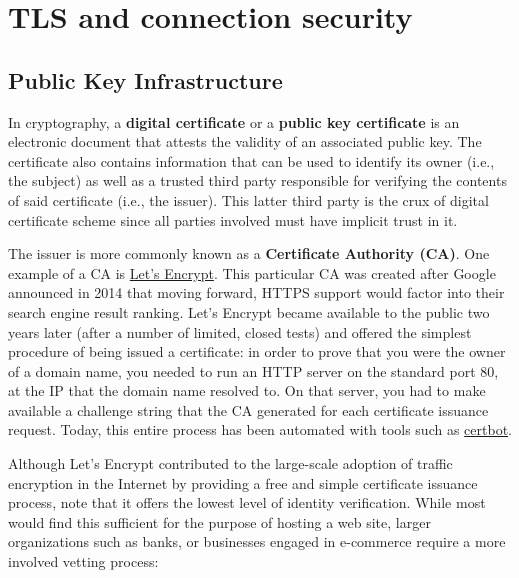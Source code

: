\section{TLS and connection security}

\subsection{Public Key Infrastructure}

In cryptography, a \textbf{digital certificate} or a \textbf{public key
certificate} is an electronic document that attests the validity of an
associated public key. The certificate also contains information that can be
used to identify its owner (i.e., the subject) as well as a trusted third party
responsible for verifying the contents of said certificate (i.e., the issuer).
This latter third party is the crux of digital certificate scheme since all
parties involved must have implicit trust in it.

The issuer is more commonly known as a \textbf{Certificate Authority (CA)}. One
example of a CA is \href{https://letsencrypt.org/}{Let's Encrypt}. This
particular CA was created after Google announced in 2014 that moving forward,
HTTPS support would factor into their search engine result ranking. Let's
Encrypt became available to the public two years later (after a number of
limited, closed tests) and offered the simplest procedure of being issued a
certificate: in order to prove that you were the owner of a domain name, you
needed to run an HTTP server on the standard port 80, at the IP that the domain
name resolved to. On that server, you had to make available a challenge string
that the CA generated for each certificate issuance request. Today, this entire
process has been automated with tools such as
\href{https://certbot.eff.org/instructions}{certbot}.

Although Let's Encrypt contributed to the large-scale adoption of traffic
encryption in the Internet by providing a free and simple certificate issuance
process, note that it offers the lowest level of identity verification. While
most would find this sufficient for the purpose of hosting a web site, larger
organizations such as banks, or businesses engaged in e-commerce require a
more involved vetting process:

